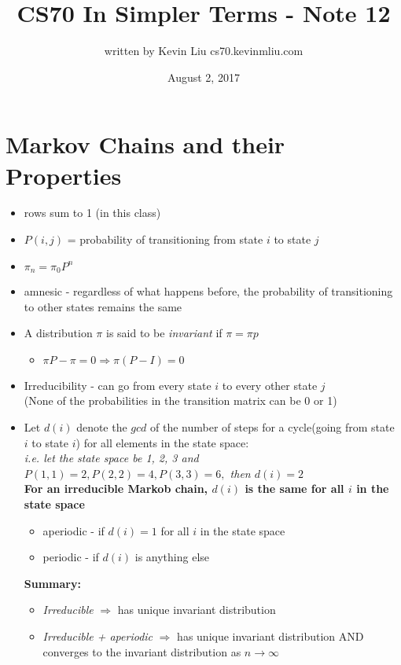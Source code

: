 \documentclass[a4paper]{article}
\title{CS70 In Simpler Terms - Note 12}
\author{written by Kevin Liu cs70.kevinmliu.com}
\date{August 2, 2017}
\begin{document}
\maketitle

\section{Markov Chains and their Properties}
\begin{itemize}
    \item rows sum to 1 (in this class)
    \item $P(i,j)$ = probability of transitioning from state $i$ to state $j$
    \item $\pi_n = \pi_0P^n$
    \item amnesic - regardless of what happens before, the probability of transitioning to other states remains the same
    \item A distribution $\pi$ is said to be \textit{invariant} if $\pi = \pi p$
    \begin{itemize}
        \item $\pi P - \pi = 0 \Rightarrow \pi(P - I) = 0$
    \end{itemize}
    \item Irreducibility - can go from every state $i$ to every other state $j$ \\
    (None of the probabilities in the transition matrix can be 0 or 1)
    \item Let $d(i)$ denote the $gcd$ of the number of steps for a cycle(going from state $i$ to state $i$) for all elements in the state space: \\\textit{i.e. let the state space be {1, 2, 3} and $P(1,1)= 2, P(2,2) = 4, P(3,3) = 6,$ then $d(i) = 2$ }\\ \textbf{For an irreducible Markob chain, $d(i)$ is the same for all $i$ in the state space}
    \begin{itemize}
        \item aperiodic - if $d(i) = 1$ for all $i$ in the state space
        \item periodic - if $d(i)$ is anything else
    \end{itemize}
    \textbf{Summary:}
    \begin{itemize}
        \item \textit{Irreducible} $\Rightarrow$ has unique invariant distribution
        \item \textit{Irreducible + aperiodic} $\Rightarrow$ has unique invariant distribution AND converges to the invariant distribution as $n \rightarrow \infty$
    \end{itemize}
\end{itemize}
\end{document}
